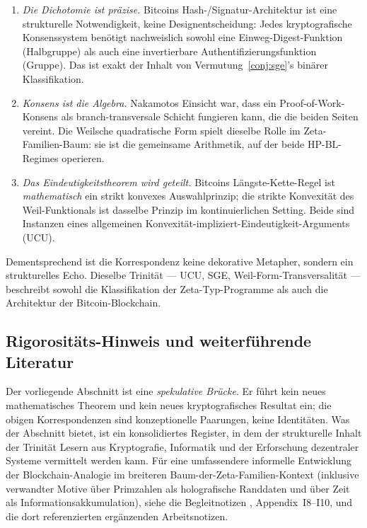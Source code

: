 \documentclass[11pt]{article}
\theoremstyle{definition}
\theoremstyle{remark}
\newcommand{\HBL}{\mathrm{HP\text{-}BL}}
\begin{document}
\begin{enumerate}
\item \emph{Die Dichotomie ist präzise.} Bitcoins Hash-/Signatur-Architektur
ist eine strukturelle Notwendigkeit, keine Designentscheidung: Jedes
kryptografische Konsenssystem benötigt nachweislich sowohl eine Einweg-Digest-Funktion
(Halbgruppe) als auch eine invertierbare Authentifizierungsfunktion
(Gruppe). Das ist exakt der Inhalt von
Vermutung~\ref{conj:sge}'s binärer Klassifikation.

\item \emph{Konsens ist die Algebra.} Nakamotos Einsicht war, dass ein
Proof-of-Work-Konsens als branch-transversale Schicht fungieren kann, die
die beiden Seiten vereint. Die Weilsche quadratische Form spielt dieselbe Rolle
im Zeta-Familien-Baum: sie ist die gemeinsame Arithmetik, auf der beide
$\HBL$-Regimes operieren.

\item \emph{Das Eindeutigkeitstheorem wird geteilt.} Bitcoins Längste-Kette-Regel
ist \emph{mathematisch} ein strikt konvexes Auswahlprinzip;
die strikte Konvexität des Weil-Funktionals ist dasselbe Prinzip im
kontinuierlichen Setting. Beide sind Instanzen eines allgemeinen
Konvexität-impliziert-Eindeutigkeit-Arguments (UCU).
\end{enumerate}

Dementsprechend ist die Korrespondenz keine dekorative Metapher, sondern ein
strukturelles Echo. Dieselbe Trinität --- UCU, SGE, Weil-Form-Transversalität ---
beschreibt sowohl die Klassifikation der Zeta-Typ-Programme als auch die Architektur
der Bitcoin-Blockchain.

\subsection{Rigorositäts-Hinweis und weiterführende Literatur}
\label{sec:blockchain-disclaimer}

Der vorliegende Abschnitt ist eine \emph{spekulative Brücke}. Er führt kein
neues mathematisches Theorem und kein neues kryptografisches Resultat ein; die
obigen Korrespondenzen sind konzeptionelle Paarungen, keine Identitäten.
Was der Abschnitt bietet, ist ein konsolidiertes Register, in dem
der strukturelle Inhalt der Trinität Lesern
aus Kryptografie, Informatik und der Erforschung dezentraler Systeme
vermittelt werden kann. Für eine umfassendere informelle Entwicklung der Blockchain-Analogie
im breiteren Baum-der-Zeta-Familien-Kontext (inklusive
verwandter Motive über Primzahlen als holografische Randdaten und über Zeit
als Informationsakkumulation), siehe die Begleitnotizen
\cite{MetaGalerkinBridge}, Appendix~I8--I10, und die dort referenzierten ergänzenden Arbeitsnotizen.
\end{document}
